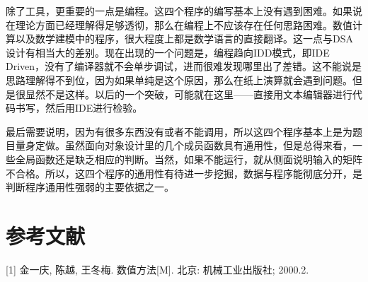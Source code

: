 \documentclass[UTF8, a4paper, zihao=-4, bibliography=totoc]{ctexart}
\begin{document}
除了工具，更重要的一点是编程。这四个程序的编写基本上没有遇到困难。如果说在理论方面已经理解得足够透彻，那么在编程上不应该存在任何思路困难。数值计算以及数学建模中的程序，很大程度上都是数学语言的直接翻译。这一点与DSA设计有相当大的差别。现在出现的一个问题是，编程趋向IDD模式，即IDE Driven，没有了编译器就不会单步调试，进而很难发现哪里出了差错。这不能说是思路理解得不到位，因为如果单纯是这个原因，那么在纸上演算就会遇到问题。但是很显然不是这样。以后的一个突破，可能就在这里——直接用文本编辑器进行代码书写，然后用IDE进行检验。

最后需要说明，因为有很多东西没有或者不能调用，所以这四个程序基本上是为题目量身定做。虽然面向对象设计里的几个成员函数具有通用性，但是总得来看，一些全局函数还是缺乏相应的判断。当然，如果不能运行，就从侧面说明输入的矩阵不合格。所以，这四个程序的通用性有待进一步挖掘，数据与程序能彻底分开，是判断程序通用性强弱的主要依据之一。

\section{参考文献}

[1] 金一庆, 陈越, 王冬梅. 数值方法[M]. 北京: 机械工业出版社; 2000.2.
\end{document}
